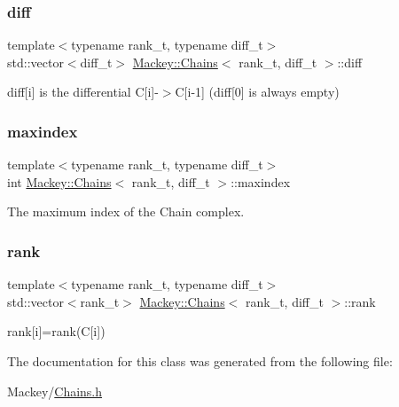 \subsubsection{\texorpdfstring{diff}{diff}}
{\footnotesize\ttfamily template$<$typename rank\+\_\+t, typename diff\+\_\+t$>$ \\
std\+::vector$<$diff\+\_\+t$>$ \hyperlink{classMackey_1_1Chains}{Mackey\+::\+Chains}$<$ rank\+\_\+t, diff\+\_\+t $>$\+::diff}



diff\mbox{[}i\mbox{]} is the differential C\mbox{[}i\mbox{]}-\/$>$C\mbox{[}i-\/1\mbox{]} (diff\mbox{[}0\mbox{]} is always empty) 

\mbox{\label{classMackey_1_1Chains_a12a79cb031092cfd3473bb6512e7ae94}} 
\subsubsection{\texorpdfstring{maxindex}{maxindex}}
{\footnotesize\ttfamily template$<$typename rank\+\_\+t, typename diff\+\_\+t$>$ \\
int \hyperlink{classMackey_1_1Chains}{Mackey\+::\+Chains}$<$ rank\+\_\+t, diff\+\_\+t $>$\+::maxindex}



The maximum index of the Chain complex. 

\mbox{\label{classMackey_1_1Chains_ad041dff6f210ae5be4de0a3b076a4d95}} 
\subsubsection{\texorpdfstring{rank}{rank}}
{\footnotesize\ttfamily template$<$typename rank\+\_\+t, typename diff\+\_\+t$>$ \\
std\+::vector$<$rank\+\_\+t$>$ \hyperlink{classMackey_1_1Chains}{Mackey\+::\+Chains}$<$ rank\+\_\+t, diff\+\_\+t $>$\+::rank}



rank\mbox{[}i\mbox{]}=rank(\+C\mbox{[}i\mbox{]}) 



The documentation for this class was generated from the following file\+:\begin{DoxyCompactItemize}
\item 
Mackey/\hyperlink{Chains_8h}{Chains.\+h}\end{DoxyCompactItemize}
